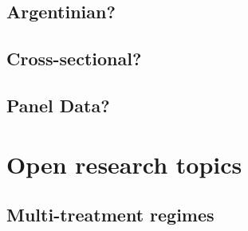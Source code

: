 \documentclass[11pt,titlepage]{article}
\begin{document}
\subsection{Argentinian?}
\subsection{Cross-sectional?}
\subsection{Panel Data?}
                                                                                                                                                             
 
\section{Open research topics}
\subsection{Multi-treatment regimes}
\end{document}
